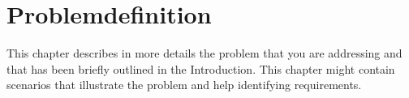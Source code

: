 \chapter{Problemdefinition}
This chapter describes in more details the problem that you are addressing and that
has been briefly outlined in the Introduction. This chapter might contain scenarios that
illustrate the problem and help identifying requirements.